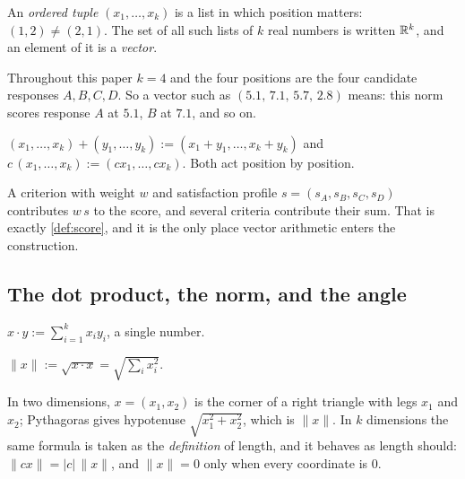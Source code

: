 An \emph{ordered tuple} $(x_1,\dots,x_k)$ is a list in which position matters:
$(1,2)\neq(2,1)$. The set of all such lists of $k$ real numbers is written $\mathbb{R}^k$,
and an element of it is a \emph{vector}.

Throughout this paper $k=4$ and the four positions are the four candidate
responses $A,B,C,D$. So a vector such as $(5.1,\,7.1,\,5.7,\,2.8)$ means: this
norm scores response $A$ at $5.1$, $B$ at $7.1$, and so on.

\begin{definition}
$(x_1,\dots,x_k)+(y_1,\dots,y_k) := (x_1+y_1,\dots,x_k+y_k)$ and
$c\,(x_1,\dots,x_k) := (cx_1,\dots,cx_k)$. Both act position by position.
\end{definition}

 A criterion with weight $w$ and
satisfaction profile $s=(s_A,s_B,s_C,s_D)$ contributes $w\,s$ to the score, and
several criteria contribute their sum. That is exactly \cref{def:score}, and it is
the only place vector arithmetic enters the construction.

\subsection{The dot product, the norm, and the angle}

\begin{definition}
$x\cdot y := \sum_{i=1}^{k} x_i y_i$, a single number.
\end{definition}

\begin{definition}[Norm]
$\|x\| := \sqrt{x\cdot x} = \sqrt{\sum_i x_i^2}$.
\end{definition}

 In two dimensions, $x=(x_1,x_2)$ is the corner
of a right triangle with legs $x_1$ and $x_2$; Pythagoras gives hypotenuse
$\sqrt{x_1^2+x_2^2}$, which is $\|x\|$. In $k$ dimensions the same formula is
taken as the \emph{definition} of length, and it behaves as length should:
$\|cx\|=|c|\,\|x\|$, and $\|x\|=0$ only when every coordinate is $0$.

